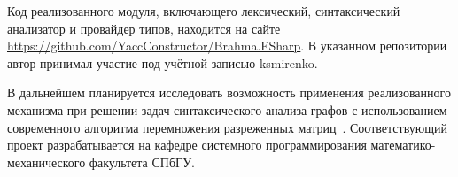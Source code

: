 Код реализованного модуля, включающего лексический, синтаксический анализатор и провайдер типов, находится на сайте \url{https://github.com/YaccConstructor/Brahma.FSharp}. В указанном репозитории автор принимал участие под учётной записью ksmirenko.

В дальнейшем планируется исследовать возможность применения реализованного механизма при решении задач синтаксического анализа графов с использованием современного алгоритма перемножения разреженных матриц~\cite{SparseMatrixMultiply}. Соответствующий проект разрабатывается на кафедре системного программирования математико-механического факультета СПбГУ.



